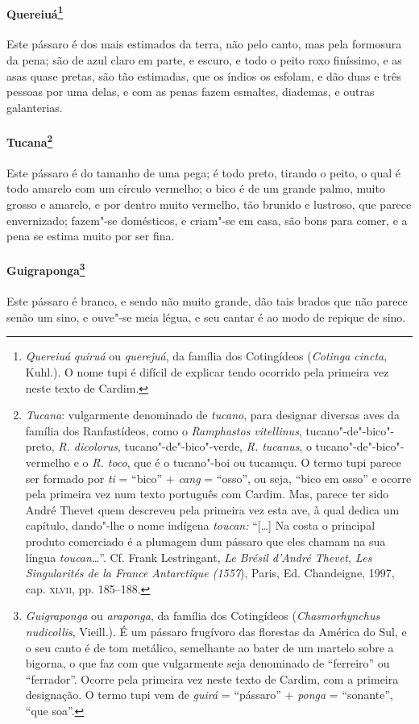\paragraph{Quereiuá\footnote{ \textit{Quereiuá} \textit{quiruá} ou
\textit{querejuá}, da família dos Cotingídeos (\textit{Cotinga
cincta}, Kuhl.). O nome tupi é difícil de explicar tendo ocorrido pela
primeira vez neste texto de Cardim.}} Este
pássaro é dos mais estimados da terra, não pelo canto, mas pela
formosura da pena; são de azul claro em parte, e escuro, e todo o peito
roxo finíssimo, e as asas quase pretas, são tão estimadas, que os
índios os esfolam, e dão duas e três pessoas por uma delas, e com as
penas fazem esmaltes, diademas, e outras galanterias.

\paragraph{Tucana\footnote{ \textit{Tucana}: vulgarmente denominado de
\textit{tucano}, para designar diversas aves da família dos
Ranfastídeos, como o \textit{Ramphastos vitellinus}, tucano"-de"-bico"-preto, 
\textit{R. dicolorus}, tucano"-de"-bico"-verde,
\textit{R. tucanus}, o tucano"-de"-bico"-vermelho e o \textit{R. toco}, 
que é o tucano"-boi ou tucanuçu. O termo tupi parece ser formado por
\textit{ti} = ``bico'' + \textit{cang} = ``osso'', ou seja, ``bico em osso''
e ocorre pela primeira vez num texto português com Cardim. Mas, parece
ter sido André Thevet quem descreveu pela primeira vez esta ave, à qual
dedica um capítulo, dando"-lhe o nome indígena \textit{toucan:} ``[\ldots{}] 
Na costa o principal produto comerciado é a plumagem dum pássaro que
eles chamam na sua língua \textit{toucan}\ldots{}''. Cf. Frank Lestringant,
\textit{Le Brésil d'André Thevet, Les Singularités de la France
Antarctique (1557}), Paris, Ed. Chandeigne, 1997, cap. \textsc{xlvii}, 
pp. 185--188.}} Este pássaro é do tamanho de uma pega; é todo
preto, tirando o peito, o qual é todo amarelo com um círculo vermelho;
o bico é de um grande palmo, muito grosso e amarelo, e por dentro muito
vermelho, tão brunido e lustroso, que parece envernizado; fazem"-se
domésticos, e criam"-se em casa, são bons para comer, e a pena se estima
muito por ser fina.

\paragraph{Guigraponga\footnote{ \textit{Guigraponga} ou
\textit{araponga}, da família dos Cotingídeos (\textit{Chasmorhynchus
nudicollis}, Vieill.). É um pássaro frugívoro das florestas da América
do Sul, e o seu canto é de tom metálico, semelhante ao bater de um
martelo sobre a bigorna, o que faz com que vulgarmente seja denominado
de ``ferreiro'' ou ``ferrador''. Ocorre pela primeira vez neste texto de
Cardim, com a primeira designação. O termo tupi vem de \textit{guirá} = 
``pássaro'' + \textit{ponga} = ``sonante'', ``que soa''.}} Este
pássaro é branco, e sendo não muito grande, dão tais brados que não
parece senão um sino, e ouve"-se meia légua, e seu cantar é ao modo de repique de sino.

